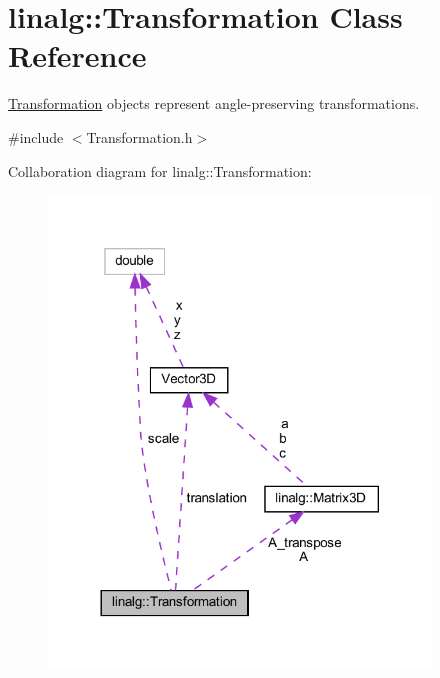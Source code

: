 \hypertarget{classlinalg_1_1Transformation}{}\section{linalg\+::Transformation Class Reference}
\label{classlinalg_1_1Transformation}


\mbox{\hyperlink{classlinalg_1_1Transformation}{Transformation}} objects represent angle-\/preserving transformations.  




{\ttfamily \#include $<$Transformation.\+h$>$}



Collaboration diagram for linalg\+::Transformation\+:
\nopagebreak
\begin{figure}[H]
\begin{center}
\leavevmode
\includegraphics[width=288pt]{classlinalg_1_1Transformation__coll__graph}
\end{center}
\end{figure}
